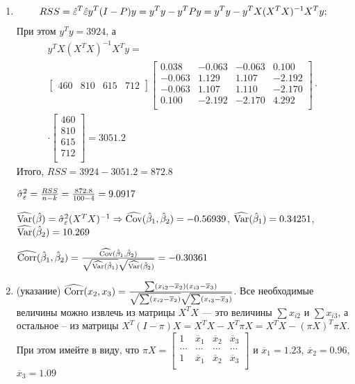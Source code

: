 \documentclass[pdftex,11pt,openany]{book}\usepackage[]{graphicx}\usepackage[]{color}
\begin{document}
\begin{solution}
\begin{enumerate}
\item 
\begin{multline}
RSS = \hat{\varepsilon}^T\hat{\varepsilon} y^T (I - P) y = y^T y - y^TPy = y^Ty - y^T X(X^TX)^{-1}X^Ty ;
\end{multline}
При этом $y^Ty=3924$,  а
\begin{multline}
y^T X(X^TX)^{-1}X^Ty= \\
 \begin{bmatrix}
460 & 810 & 615 & 712
\end{bmatrix} \begin{bmatrix}
0.038 & -0.063 & -0.063 & 0.100 \\
-0.063 & 1.129 & 1.107 & -2.192 \\
-0.063 & 1.107 & 1.110 & -2.170 \\
0.100 & -2.192 & -2.170 & 4.292 \\
\end{bmatrix} \cdot \\
\cdot 
\begin{bmatrix}
460\\
810\\
615\\
712\\
\end{bmatrix} = 3051.2
\end{multline}
Итого, $RSS= 3924 - 3051.2 = 872.8$
 
$\hat{\sigma}_{\varepsilon}^2 = \frac{RSS}{n-k} = \frac{872.8}{100-4} = 9.0917$

$\widehat{\operatorname{Var}}(\hat{\beta}) = \hat{\sigma}_{\varepsilon}^2 (X^T X)^{-1} \Rightarrow \widehat{\operatorname{Cov}}(\hat{\beta}_1, \hat{\beta}_2) = -0.56939$, $\widehat{\operatorname{Var}}(\hat{\beta}_1) = 0.34251$, $\widehat{\operatorname{Var}}(\hat{\beta}_2) = 10.269$

$\widehat{\operatorname{Corr}}(\hat{\beta}_1, \hat{\beta}_2) = \frac{\widehat{\operatorname{Cov}}(\hat{\beta}_1, \hat{\beta}_2)}{\sqrt{\widehat{\operatorname{Var}}(\hat{\beta}_1)}\sqrt{\widehat{\operatorname{Var}}(\hat{\beta}_2)}} = -0.30361$

\item(указание) $\widehat{\operatorname{Corr}}(x_2, x_3) = \frac{\sum (x_{i2} - \overline{x}_2) (x_{i3} - \overline{x}_3)}{\sqrt{\sum (x_{i2} - \overline{x}_2)}\sqrt{\sum (x_{i3} - \overline{x}_3)}}$. Все необходимые величины можно извлечь из матрицы $X^T X$ --- это величины $\sum x_{i2}$ и $\sum x_{i3}$, а остальное -- из матрицы $X^T (I - \pi) X = X^T X - X^T \pi X = X^T X - (\pi X)^T \pi X$. При этом имейте в виду, что
$\pi X = \begin{bmatrix}
1 & \overline{x}_1 & \overline{x}_2 & \overline{x}_3 \\
\ldots & \ldots & \ldots & \ldots \\
1 & \overline{x}_1 & \overline{x}_2 & \overline{x}_3 \\
\end{bmatrix}$ и $\overline{x}_1 = 1.23$, $\overline{x}_2 = 0.96$, $\overline{x}_3 = 1.09$


\end{enumerate}
\end{solution}
\end{document}
